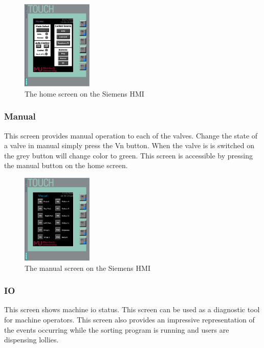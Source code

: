         \begin{figure}[H]
            \centering
            \includegraphics[width = 0.3\textwidth]{2_images/hmiHome.png}
            \caption{The home screen on the Siemens HMI}
            \label{fig:hmiHome}
        \end{figure} 
        
        \subsubsection{Manual}
            This screen provides manual operation to each of the valves. Change the state of a valve in manual simply press the Vn button. When the valve is is switched on the grey button will change color to green. This screen is accessible by pressing the manual button on the home screen. 

        \begin{figure}[H]
            \centering
            \includegraphics[width = 0.3\textwidth]{2_images/hmiManual}
            \caption{The manual screen on the Siemens HMI}
            \label{fig:hmiManual}
        \end{figure} 

        \subsubsection{IO}
            This screen shows machine \acrshort{io} status. This screen can be used as a diagnostic tool for machine operators. This screen also provides an impressive representation of the events occurring while the sorting program is running and users are dispensing lollies. 

